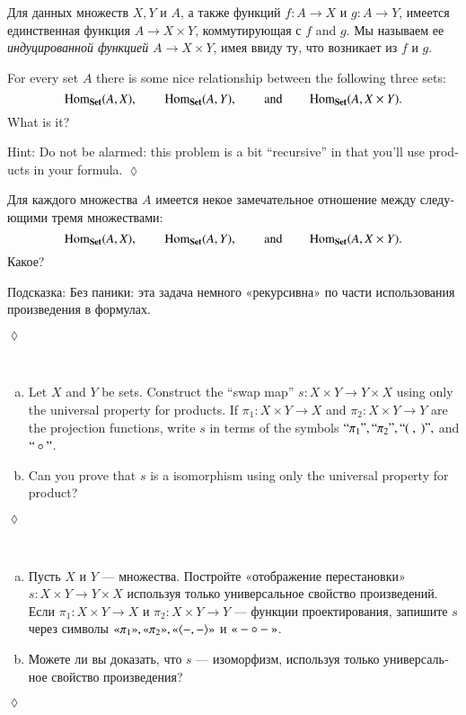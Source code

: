 \documentclass[a4paper]{book}
\def\tn{\textnormal}
\newcommand{\qtE}[1]{\tn{“}#1\tn{”}}
\newcommand{\qtR}[1]{\tn{«}#1\tn{»}}
\def\Hom{\tn{Hom}}
\def\hsp{\hspace{.3in}}
\def\to{\rightarrow}
\def\taking{\colon}
\def\la{\langle}
\def\ra{\rangle}
\newcommand{\prodmap}[2]{\la#1,#2\ra}
\def\Set{{\bf Set}}
\theoremstyle{myth}
\newtheorem{excENG}[envENG]{\begin{english}Exercise\end{english}}
\newenvironment{exerciseENG}{\begin{excENG}}{\hspace*{\fill}$\lozenge$\end{excENG}}
\newtheorem{remarkRUS}[envRUS]{\begin{russian}Примечание\end{russian}}
\newtheorem{excRUS}[envRUS]{\begin{russian}Упражнение\end{russian}}
\newenvironment{exerciseRUS}{\begin{excRUS}}{\hspace*{\fill}$\lozenge$\end{excRUS}}
\def\sexc{\begin{enumerate}[a.)]\setlength{\itemsep}{.1cm}\setlength{\parskip}{.1cm}\item}
\def\next{\item}
\def\endsexc{\end{enumerate}}
\begin{document}
\begin{english}
\begin{remarkRUS}
\begin{russian}Для данных множеств $X, Y$ и $A$, а также функций $f\taking A\to X$ и $g\taking A\to Y$, имеется единственная функция $A\to X\times Y$, коммутирующая с $f$ and $g$. Мы называем ее {\em индуцированной функцией} $A\to X\times Y$, имея ввиду ту, что возникает из $f$ и $g$. \end{russian}
\end{remarkRUS}

\begin{exerciseENG}
For every set $A$ there is some nice relationship between the following three sets: $$\Hom_{\Set}(A,X), \hsp \Hom_\Set(A,Y), \hsp \text{and} \hsp\Hom_\Set(A,X\times Y).$$ What is it?

Hint: Do not be alarmed: this problem is a bit “recursive” in that you'll use products in your formula.
\end{exerciseENG}

\begin{exerciseRUS}
\begin{russian}Для каждого множества $A$ имеется некое замечательное отношение между следующими тремя множествами: $$\Hom_{\Set}(A,X), \hsp \Hom_\Set(A,Y), \hsp \text{and} \hsp\Hom_\Set(A,X\times Y).$$ Какое?

Подсказка: Без паники: эта задача немного «рекурсивна» по части использования произведения в формулах. \end{russian}
\end{exerciseRUS}

\begin{exerciseENG}~
\sexc Let $X$ and $Y$ be sets. Construct the “swap map” $s\taking X\times Y\to Y\times X$ using only the universal property for products. If $\pi_1\taking X\times Y\to X$ and $\pi_2\taking X\times Y\to Y$ are the projection functions, write $s$ in terms of the symbols $\qtE{\pi_1}, \qtE{\pi_2}, \qtE{(\ ,\ )},$ and $\qtE{\circ}$. 
\next Can you prove that $s$ is a isomorphism using only the universal property for product?
\endsexc
\end{exerciseENG}

\begin{exerciseRUS}~
\begin{russian}\sexc Пусть $X$ и $Y$ — множества. Постройте «отображение перестановки» $s\taking X\times Y\to Y\times X$ используя только универсальное свойство произведений. Если $\pi_1\taking X\times Y\to X$ и $\pi_2\taking X\times Y\to Y$ — функции проектирования, запишите $s$ через символы $\qtR{\pi_1}, \qtR{\pi_2}, \qtR{\prodmap{-}{-}}$ и $\qtR{- \circ -}$. 
\next Можете ли вы доказать, что $s$ — изоморфизм, используя только универсальное свойство произведения?
\endsexc\end{russian}
\end{exerciseRUS}


\end{english}
\end{document}
